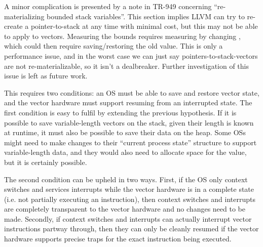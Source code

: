 \pagebreak
A minor complication is presented by a note in TR-949\cite[Section 3.8.2]{TR-949} concerning ``re-materializing bounded stack variables''.
This section implies LLVM can try to re-create a pointer-to-stack at any time with minimal cost, but this may not be able to apply to vectors.
Measuring the bounds requires measuring  by changing , which could then require saving/restoring the old value.
This is only a performance issue, and in the worst case we can just say pointers-to-stack-vectors are not re-materializable, so it isn't a dealbreaker.
Further investigation of this issue is left as future work.

This requires two conditions: an OS must be able to save and restore vector state, and the vector hardware must support resuming from an interrupted state.
The first condition is easy to fulfil by extending the previous hypothesis. 
If it is possible to save variable-length vectors on the stack, given their length is known at runtime, it must also be possible to save their data on the heap.
Some OSs might need to make changes to their ``current process state'' structure to support variable-length data, and they would also need to allocate space for the  value, but it is certainly possible.

The second condition can be upheld in two ways.
First, if the OS only context switches and services interrupts while the vector hardware is in a complete state (i.e. not partially executing an instruction), then context switches and interrupts are completely transparent to the vector hardware and no changes need to be made.
Secondly, if context switches and interrupts can actually interrupt vector instructions partway through, then they can only be cleanly resumed if the vector hardware supports precise traps for the exact instruction being executed.
